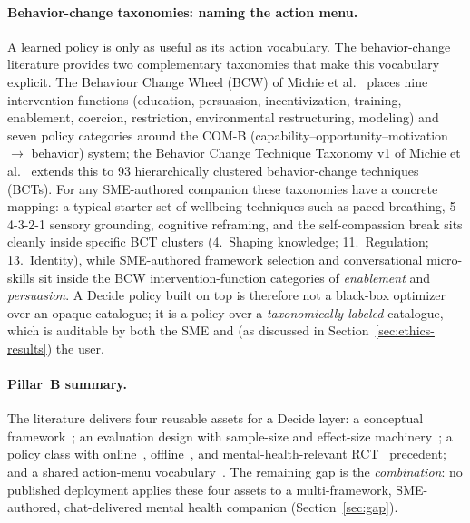 \documentclass[11pt,a4paper]{article}
\newcommand{\secref}[1]{Section~\ref{#1}}
\begin{document}
\paragraph{Behavior-change taxonomies: naming the action menu.}
A learned policy is only as useful as its action vocabulary. The
behavior-change literature provides two complementary taxonomies
that make this vocabulary explicit. The Behaviour Change Wheel
(BCW) of Michie et al.~\cite{Michie2011BCW} places nine
intervention functions (education, persuasion, incentivization,
training, enablement, coercion, restriction, environmental
restructuring, modeling) and seven policy categories around the
COM-B (capability--opportunity--motivation $\to$ behavior) system;
the Behavior Change Technique Taxonomy v1 of Michie et
al.~\cite{Michie2013BCTTaxonomy} extends this to 93 hierarchically
clustered behavior-change techniques (BCTs). For any SME-authored
companion these taxonomies have a concrete mapping: a typical
starter set of wellbeing techniques such as paced breathing,
5-4-3-2-1 sensory grounding, cognitive reframing, and the
self-compassion break sits cleanly inside specific BCT clusters
(4.~Shaping knowledge; 11.~Regulation; 13.~Identity), while
SME-authored framework selection and conversational micro-skills
sit inside the BCW intervention-function categories of
\emph{enablement} and \emph{persuasion}. A Decide policy built on
top is therefore not a black-box optimizer over an opaque
catalogue; it is a policy over a \emph{taxonomically labeled}
catalogue, which is auditable by both the SME and (as discussed in
\secref{sec:ethics-results}) the user.

\paragraph{Pillar~B summary.}
The literature delivers four reusable assets for a Decide layer:
a conceptual framework~\cite{NahumShani2018JITAI}; an evaluation
design with sample-size and effect-size
machinery~\cite{Klasnja2015MRT,Liao2016MRTSampleSize,Luers2018StandardizedEffect,Seewald2019MRTData};
a policy class with online~\cite{Liao2020PersonalizedHeartSteps},
offline~\cite{Ameko2020CMABEmotion}, and mental-health-relevant
RCT~\cite{Aguilera2024DIAMANTERL} precedent; and a shared
action-menu vocabulary~\cite{Michie2011BCW,Michie2013BCTTaxonomy}.
The remaining gap is the \emph{combination}: no published
deployment applies these four assets to a multi-framework,
SME-authored, chat-delivered mental health companion
(\secref{sec:gap}).
\end{document}
